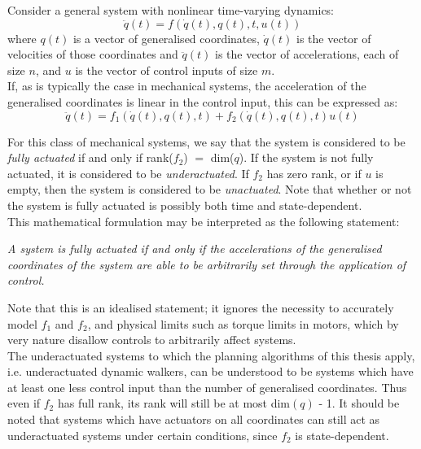 Consider a general system with nonlinear time-varying dynamics:
\begin{equation}
	\ddot{q}(t) = f\left(\dot{q}(t), q(t), t, u(t)\right)
\end{equation}
where $q(t)$ is a vector of generalised coordinates, $\dot{q}(t)$ is the vector of velocities of those coordinates and $\ddot{q}(t)$ is the vector of accelerations, each of size $n$, and $u$ is the vector of control inputs of size $m$. \\

If, as is typically the case in mechanical systems, the acceleration of the generalised coordinates is linear in the control input, this can be expressed as: \\
\begin{equation}
	\ddot{q}(t) = f_1\left(\dot{q}(t), q(t), t\right) + f_2\left(\dot{q}(t), q(t), t\right)u(t)
\end{equation}

For this class of mechanical systems, we say that the system is considered to be \textit{fully actuated} if and only if rank($f_2$) $=$ dim($q$). If the system is not fully actuated, it is considered to be \textit{underactuated}. If $f_2$ has zero rank, or if $u$ is empty, then the system is considered to be \textit{unactuated}. Note that whether or not the system is fully actuated is possibly both time and state-dependent.  \\

This mathematical formulation may be interpreted as the following statement:

\textit{A system is fully actuated if and only if the accelerations of the generalised coordinates of the system are able to be arbitrarily set through the application of control.}

Note that this is an idealised statement; it ignores the necessity to accurately model $f_1$ and $f_2$, and physical limits such as torque limits in motors, which by very nature disallow controls to arbitrarily affect systems. \\

The underactuated systems to which the planning algorithms of this thesis apply, i.e. underactuated dynamic walkers, can be understood to be systems which have at least one less control input than the number of generalised coordinates. Thus even if $f_2$ has full rank, its rank will still be at most dim$(q)$ - 1. It should be noted that systems which have actuators on all coordinates can still act as underactuated systems under certain conditions, since $f_2$ is state-dependent.